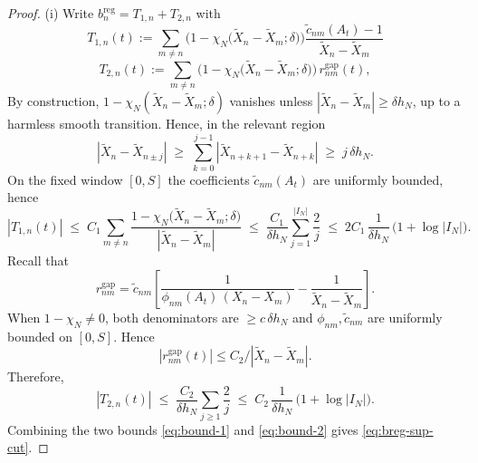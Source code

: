 \documentclass[10pt,a4paper]{amsart}
\begin{document}
\begin{proof} 

(i) Write $b^{\mathrm{reg}}_{n}=T_{1,n}+T_{2,n}$ with
\begin{equation}
T_{1,n}(t):=\sum_{m\neq n}
\Big(1-\chi_N\!\big(\widetilde X_n-\widetilde X_m;\delta\big)\Big)
\frac{\widetilde c_{nm}(A_t)-1}{\widetilde X_n-\widetilde X_m} 
\end{equation}
\begin{equation}
T_{2,n}(t):=\sum_{m\neq n}
\Big(1-\chi_N\!\big(\widetilde X_n-\widetilde X_m;\delta\big)\Big)\, r^{\mathrm{gap}}_{nm}(t),
\end{equation}
By construction, $1-\chi_N(\widetilde X_n-\widetilde X_m;\delta)$ vanishes unless
$|\widetilde X_n-\widetilde X_m|\ge \delta h_N$, up to a harmless smooth
transition. Hence, in the relevant region 
\begin{equation}\label{eq:LB}
|\widetilde X_n-\widetilde X_{n\pm j}|
\;\ge\; \sum_{k=0}^{j-1}|\widetilde X_{n+k+1}-\widetilde X_{n+k}|
\;\ge\; j\,\delta h_N .
\end{equation}
On the fixed window $[0,S]$ the coefficients $\widetilde c_{nm}(A_t)$ are
uniformly bounded, hence
\begin{equation}
\label{eq:bound-1}
|T_{1,n}(t)|
\;\le\; C_1 \sum_{m\neq n}\frac{1-\chi_N\!\big(\widetilde X_n-\widetilde X_m;\delta\big)}
{|\widetilde X_n-\widetilde X_m|}
\;\le\; \frac{C_1}{\delta h_N}\sum_{j=1}^{|I_N|}\frac{2}{j}
\;\le\;2  C_1 \,\frac{1}{\delta h_N}\,\big(1+\log |I_N|\big).
\end{equation} 
Recall that
\begin{equation}
r^{\mathrm{gap}}_{nm}
=\widetilde c_{nm}\left[\frac{1}{\phi_{nm}(A_t)\,(X_n-X_m)}
-\frac{1}{\widetilde X_n-\widetilde X_m}\right].
\end{equation}
When $1-\chi_N\neq 0$, both denominators are $\ge c\,\delta h_N$ and
$\phi_{nm},\widetilde c_{nm}$ are uniformly bounded on $[0,S]$. Hence 
\begin{equation}
|r^{\mathrm{gap}}_{nm}(t)|\le C_{2}/|\widetilde X_n-\widetilde X_m|.
\end{equation}
Therefore,
\begin{equation}
\label{eq:bound-2}
|T_{2,n}(t)|
\;\le\; \frac{C_2}{\delta h_N}\sum_{j\ge1}\frac{2}{j}
\;\le\; C_{2}\,\frac{1}{\delta h_N}\,\big(1+\log |I_N|\big).
\end{equation}
Combining the two bounds \eqref{eq:bound-1} and \eqref{eq:bound-2} gives \eqref{eq:breg-sup-cut}.


\end{proof}
\end{document}
